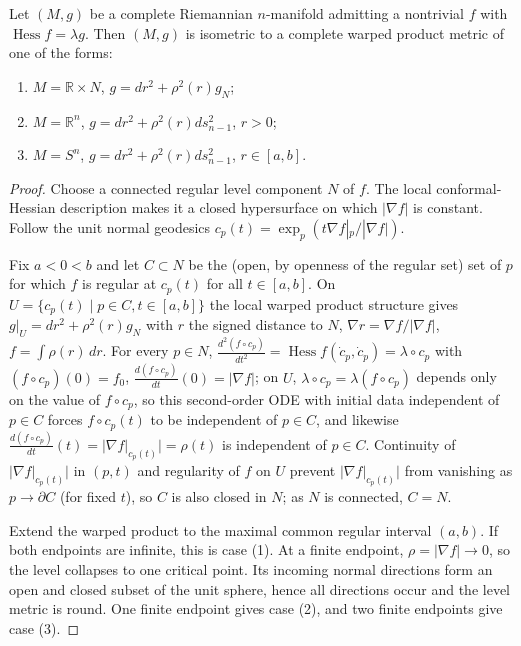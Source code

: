 \begin{theorem}
  \label{thm:pet-ch5-tashiro}
  Let $(M,g)$ be a complete Riemannian $n$-manifold admitting a nontrivial $f$
  with $\operatorname{Hess}f=\lambda g$. Then $(M,g)$ is isometric to a complete
  warped product metric of one of the forms:
  \begin{enumerate}
  \item[(1)] $M=\mathbb R\times N$, $g=dr^2+\rho^2(r)g_N$;
  \item[(2)] $M=\mathbb R^n$, $g=dr^2+\rho^2(r)ds_{n-1}^2$, $r>0$;
  \item[(3)] $M=S^n$, $g=dr^2+\rho^2(r)ds_{n-1}^2$, $r\in[a,b]$.
  \end{enumerate}
\end{theorem}
\begin{proof}
  \sketch
  Choose a connected regular level component $N$ of $f$.  The local
  conformal-Hessian description makes it a closed hypersurface on which
  $|\nabla f|$ is constant.  Follow the unit normal geodesics
  $c_p(t)=\exp_p(t\nabla f|_p/|\nabla f|)$.

  Fix $a<0<b$ and let $C\subset N$ be the (open, by openness of the regular set) set
  of $p$ for which $f$ is regular at $c_p(t)$ for all $t\in[a,b]$. On
  $U=\{c_p(t)\mid p\in C,t\in[a,b]\}$ the local warped product structure gives
  $g|_U=dr^2+\rho^2(r)g_N$ with $r$ the signed distance to $N$,
  $\nabla r=\nabla f/|\nabla f|$, $f=\int\rho(r)\,dr$. For every $p\in N$,
  $\frac{d^2(f\circ c_p)}{dt^2}=\operatorname{Hess}f(\dot c_p,\dot c_p)=\lambda\circ c_p$
  with $(f\circ c_p)(0)=f_0$, $\frac{d(f\circ c_p)}{dt}(0)=|\nabla f|$; on $U$,
  $\lambda\circ c_p=\lambda(f\circ c_p)$ depends only on the value of
  $f\circ c_p$, so this second-order ODE with initial data independent of
  $p\in C$ forces $f\circ c_p(t)$ to be independent of $p\in C$, and likewise
  $\frac{d(f\circ c_p)}{dt}(t)=|\nabla f|_{c_p(t)}|=\rho(t)$ is independent of
  $p\in C$. Continuity of $|\nabla f|_{c_p(t)}|$ in $(p,t)$ and regularity of $f$
  on $U$ prevent $|\nabla f|_{c_p(t)}|$ from vanishing as $p\to\partial C$ (for
  fixed $t$), so $C$ is also closed in $N$; as $N$ is connected, $C=N$.

  Extend the warped product to the maximal common regular interval $(a,b)$.  If
  both endpoints are infinite, this is case (1).  At a finite endpoint,
  $\rho=|\nabla f|\to0$, so the level collapses to one critical point.  Its incoming
  normal directions form an open and closed subset of the unit sphere, hence all
  directions occur and the level metric is round.  One finite endpoint gives case
  (2), and two finite endpoints give case (3).
\end{proof}

